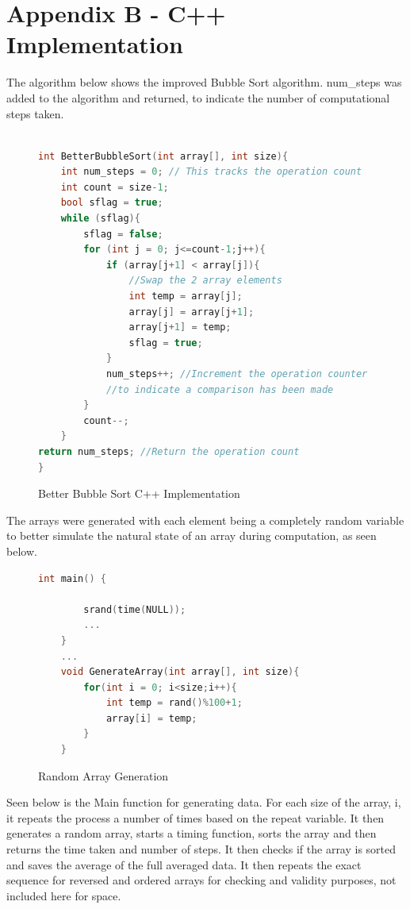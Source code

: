 \documentclass[]{article}
\begin{document}
\section{Appendix B - C++ Implementation}
The algorithm below shows the improved Bubble Sort algorithm. num\_steps was added to the algorithm and returned, to indicate the number of computational steps taken. 
\begin{figure}[H]\label{BetterBubbleSortImplemented}
	\caption{Better Bubble Sort C++ Implementation}
	\begin{lstlisting}[language=c++]

int BetterBubbleSort(int array[], int size){
	int num_steps = 0; // This tracks the operation count
	int count = size-1;
	bool sflag = true;
	while (sflag){
		sflag = false;
		for (int j = 0; j<=count-1;j++){
			if (array[j+1] < array[j]){
				//Swap the 2 array elements
				int temp = array[j];
				array[j] = array[j+1];
				array[j+1] = temp;
				sflag = true;
			}
			num_steps++; //Increment the operation counter 
			//to indicate a comparison has been made			
		}
		count--;
	}
return num_steps; //Return the operation count
}
	\end{lstlisting}
\end{figure}
The arrays were generated with each element being a completely random variable to better simulate the natural state of an array during computation, as seen below. 
\begin{figure}[H]\label{SrandImp}
	\caption{Random Array Generation}
	\begin{lstlisting}[language=c++]
	int main() {
	
		srand(time(NULL));
		...
	}
	...
	void GenerateArray(int array[], int size){
		for(int i = 0; i<size;i++){
			int temp = rand()%100+1;
			array[i] = temp;
		}
	}
	\end{lstlisting}
\end{figure}
Seen below is the Main function for generating data. For each size of the array, i, it repeats the process a number of times based on the repeat variable. It then generates a random array, starts a timing function, sorts the array and then returns the time taken and number of steps. It then checks if the array is sorted and saves the average of the full averaged data. It then repeats the exact sequence for reversed and ordered arrays for checking and validity purposes, not included here for space.
\end{document}

